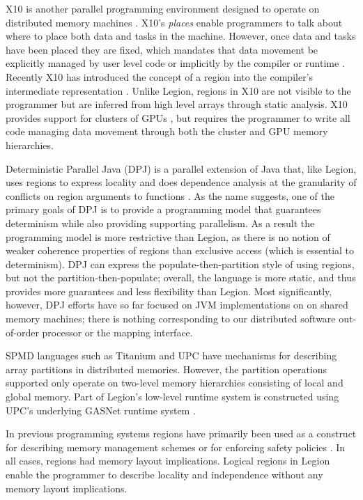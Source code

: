 X10 is another parallel programming environment designed to operate on distributed
memory machines \cite{X1005}.  X10's {\em places} enable programmers to talk about where
to place both data and tasks in the machine.  However, once data and tasks have
been placed they are fixed, which mandates that data movement be explicitly managed by
user level code or implicitly by the compiler or runtime \cite{X1008}.  Recently X10 has introduced
the concept of a region into the compiler's intermediate representation \cite{X1011}.
Unlike Legion, regions in X10 are not visible to the programmer but are inferred
from high level arrays through static analysis.  X10 provides support for clusters of GPUs
\cite{X10GPU}, but requires the programmer to write all code managing data movement
through both the cluster and GPU memory hierarchies.

Deterministic Parallel Java (DPJ) is a parallel extension of Java
that, like Legion, uses regions to express locality and does
dependence analysis at the granularity of conflicts on region
arguments to functions \cite{Bocchino09}.  As the name suggests, one
of the primary goals of DPJ is to provide a programming model that
guarantees determinism while also providing supporting parallelism.
As a result the programming model is more restrictive than Legion, as
there is no notion of weaker coherence properties of regions than
exclusive access (which is essential to determinism).  DPJ can express
the populate-then-partition style of using regions, but not the
partition-then-populate; overall, the language is more static, and
thus provides more guarantees and less flexibility than Legion.  Most
significantly, however, DPJ efforts have so far focused on JVM
implementations on on shared memory machines; there is nothing
corresponding to our distributed software out-of-order processor or
the mapping interface.

SPMD languages such as Titanium \cite{TIT98} and UPC \cite{UPC99} have
mechanisms for describing array partitions in distributed memories.
However, the partition operations supported only operate on two-level
memory hierarchies consisting of local and global memory. 
Part of Legion's
low-level runtime system is constructed using UPC's underlying GASNet
runtime system \cite{GASNET07}.


In previous programming systems regions have primarily been used as a construct for
describing memory management schemes \cite{REAPS02}\cite{RC01}  
or for enforcing safety policies \cite{CYCLONE01}.  In all cases, regions had
memory layout implications.  Logical regions in Legion enable the programmer to
describe locality and independence without any memory layout implications.

